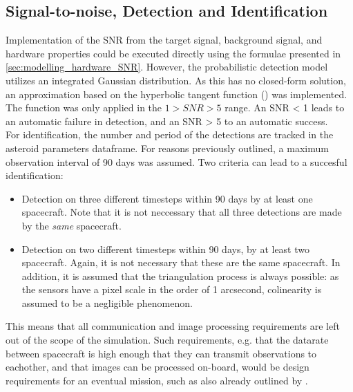 \subsection{Signal-to-noise, Detection and Identification}
Implementation of the SNR from the target signal, background signal, and hardware properties could be executed directly using the formulae presented in \autoref{sec:modelling_hardware_SNR}. However, the probabilistic detection model utilizes an integrated Gaussian distribution. As this has no closed-form solution, an approximation based on the hyperbolic tangent function (\cite{GaussianTanh}) was implemented. The function was only applied in the $1 > SNR > 5$ range. An SNR < 1 leads to an automatic failure in detection, and an SNR > 5 to an automatic success. \\

For identification, the number and period of the detections are tracked in the asteroid parameters dataframe. For reasons previously outlined, a maximum observation interval of 90 days was assumed. Two criteria can lead to a succesful identification:
\begin{itemize}
 \item Detection on three different timesteps within 90 days by at least one spacecraft. Note that it is not neccessary that all three detections are made by the \textit{same} spacecraft.
 \item Detection on two different timesteps within 90 days, by at least two spacecraft. Again, it is not necessary that these are the same spacecraft. In addition, it is assumed that the triangulation process is always possible: as the sensors have a pixel scale in the order of 1 arcsecond, colinearity is assumed to be a negligible phenomenon.
\end{itemize}

This means that all communication and image processing requirements are left out of the scope of the simulation. Such requirements, e.g. that the datarate between spacecraft is high enough that they can transmit observations to eachother, and that images can be processed on-board, would be design requirements for an eventual mission, such as also already outlined by \cite{2017NEOSDT}.

